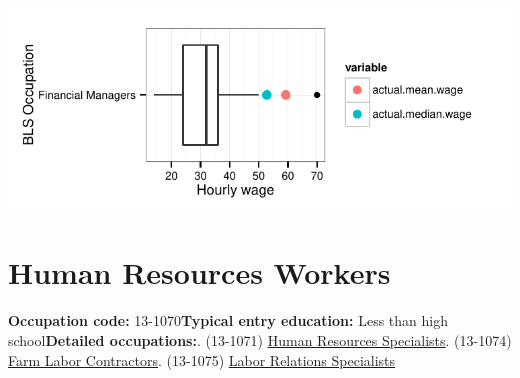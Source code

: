 \documentclass[a4paper,10pt]{article}\usepackage[]{graphicx}\usepackage[]{color}
\makeatletter
\def\maxwidth{ %
  \ifdim\Gin@nat@width>\linewidth
    \linewidth
  \else
    \Gin@nat@width
  \fi
}
\makeatother
\begin{document}
{\centering \includegraphics[width=\maxwidth]{figure/unnamed-chunk-271} 

}


\newpage\section{Human Resources Workers}\textbf{Occupation code:} 13-1070\newline\textbf{Typical entry education:} Less than high school\newline\textbf{Detailed occupations:}. (13-1071)  \href{http://www.bls.gov/oes/current/oes131071.htm}{Human Resources Specialists}. (13-1074)  \href{http://www.bls.gov/oes/current/oes131074.htm}{Farm Labor Contractors}. (13-1075)  \href{http://www.bls.gov/oes/current/oes131075.htm}{Labor Relations Specialists}\newline%
\end{document}
